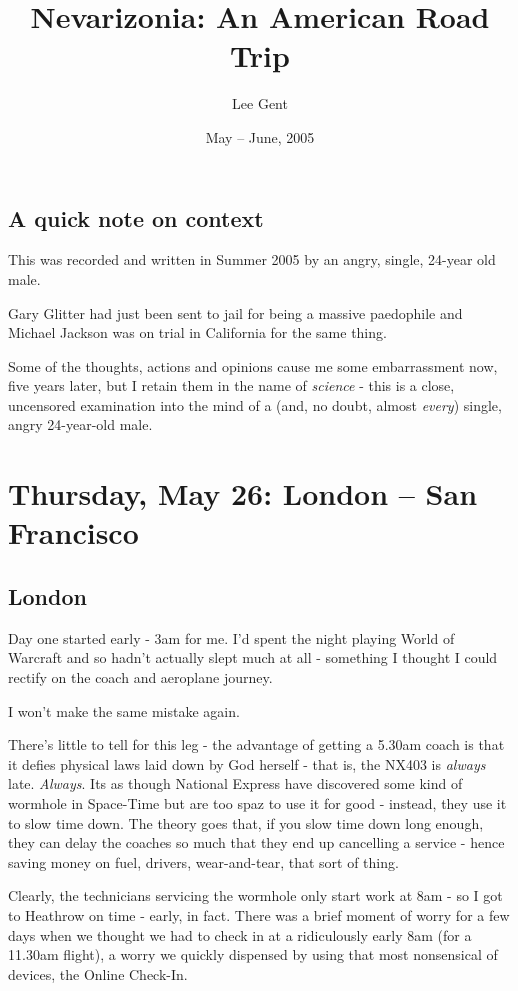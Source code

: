 \documentclass[a5paper,10pt,titlepage,draft]{book}
\title{Nevarizonia: An American Road Trip}
\author{Lee Gent}
\date{May -- June, 2005}
\begin{document}
\frontmatter
\maketitle
\section*{A quick note on context}
This was recorded and written in Summer 2005 by an angry, single, 24-year old male.

Gary Glitter had just been sent to jail for being a massive paedophile and Michael Jackson was on trial in California for the same thing.

Some of the thoughts, actions and opinions cause me some embarrassment now, five years later, but I retain them in the name of \emph{science} - this is a close, uncensored examination into the mind of a (and, no doubt, almost \emph{every}) single, angry 24-year-old male.

\mainmatter
\chapter[London -- San Francisco]{Thursday, May 26: London -- San Francisco}
\section*{London}
Day one started early - 3am for me.  I'd spent the night playing World of Warcraft and so hadn't actually slept much at all - something I thought I could rectify on the coach and aeroplane journey.

I won't make the same mistake again.

There's little to tell for this leg - the advantage of getting a 5.30am coach is that it defies physical laws laid down by God herself - that is, the NX403 is \emph{always} late.  \emph{Always}.  Its as though National Express have discovered some kind of wormhole in Space-Time but are too spaz to use it for good - instead, they use it to slow time down.  The theory goes that, if you slow time down long enough, they can delay the coaches so much that they end up cancelling a service - hence saving money on fuel, drivers, wear-and-tear, that sort of thing.

Clearly, the technicians servicing the wormhole only start work at 8am - so I got to Heathrow on time - early, in fact.  There was a brief moment of worry for a few days when we thought we had to check in at a ridiculously early 8am (for a 11.30am flight), a worry we quickly dispensed by using that most nonsensical of devices, the Online Check-In.
\end{document}
